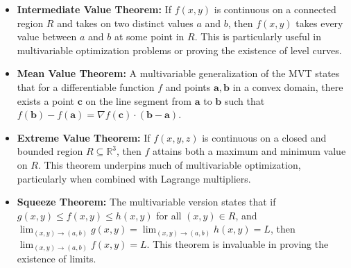 \begin{itemize} 
    \item \textbf{Intermediate Value Theorem:} If \( f(x, y) \) is continuous on a connected region \( R \) and takes on two distinct values \( a \) and \( b \), then \( f(x, y) \) takes every value between \( a \) and \( b \) at some point in \( R \). This is particularly useful in multivariable optimization problems or proving the existence of level curves.
    
    \item \textbf{Mean Value Theorem:}  A multivariable generalization of the MVT states that for a differentiable function \( f \) and points \( \mathbf{a}, \mathbf{b} \) in a convex domain, there exists a point \( \mathbf{c} \) on the line segment from \( \mathbf{a} \) to \( \mathbf{b} \) such that \( f(\mathbf{b}) - f(\mathbf{a}) = \nabla f(\mathbf{c}) \cdot (\mathbf{b} - \mathbf{a}) \).

    \item \textbf{Extreme Value Theorem:}  If \( f(x, y, z) \) is continuous on a closed and bounded region \( R \subseteq \mathbb{R}^3 \), then \( f \) attains both a maximum and minimum value on \( R \). This theorem underpins much of multivariable optimization, particularly when combined with Lagrange multipliers.

    \item \textbf{Squeeze Theorem:}  The multivariable version states that if \( g(x, y) \leq f(x, y) \leq h(x, y) \) for all \( (x, y) \in R \), and \( \lim_{(x, y) \to (a, b)} g(x, y) = \lim_{(x, y) \to (a, b)} h(x, y) = L \), then \( \lim_{(x, y) \to (a, b)} f(x, y) = L \). This theorem is invaluable in proving the existence of limits.

\end{itemize}

